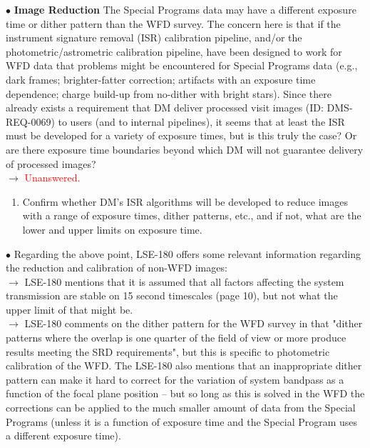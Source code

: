 \documentclass[DM,lsstdraft,toc]{lsstdoc}
\begin{document}
$\bullet$ \textbf{Image Reduction} The Special Programs data may have a different exposure time or dither pattern than the WFD survey. The concern here is that if the instrument signature removal (ISR) calibration pipeline, and/or the photometric/astrometric calibration pipeline, have been designed to work for WFD data that problems might be encountered for Special Programs data (e.g., dark frames; brighter-fatter correction; artifacts with an exposure time dependence; charge build-up from no-dither with bright stars). Since there already exists a requirement that DM deliver processed visit images (ID: DMS-REQ-0069) to users (and to internal pipelines), it seems that at least the ISR must be developed for a variety of exposure times, but is this truly the case? Or are there exposure time boundaries beyond which DM will not guarantee delivery of processed images? \\
$\rightarrow$ \textcolor{red}{Unanswered.}
\begin{enumerate}[resume,topsep=-10pt,label= \textbf{Action \Roman*.}] \item Confirm whether DM's ISR algorithms will be developed to reduce images with a range of exposure times, dither patterns, etc., and if not, what are the lower and upper limits on exposure time. \end{enumerate}

$\bullet$ Regarding the above point, LSE-180 offers some relevant information regarding the reduction and calibration of non-WFD images: \\
$\rightarrow$ LSE-180 mentions that it is assumed that all factors affecting the system transmission are stable on 15 second timescales (page 10), but not what the upper limit of that might be. \\
$\rightarrow$ LSE-180 comments on the dither pattern for the WFD survey in that "dither patterns where the overlap is one quarter of the field of view or more produce results meeting the SRD requirements", but this is specific to photometric calibration of the WFD. The LSE-180 also mentions that an inappropriate dither pattern can make it hard to correct for the variation of system bandpass as a function of the focal plane position -- but so long as this is solved in the WFD the corrections can be applied to the much smaller amount of data from the Special Programs (unless it is a function of exposure time and the Special Program uses a different exposure time).
\end{document}
